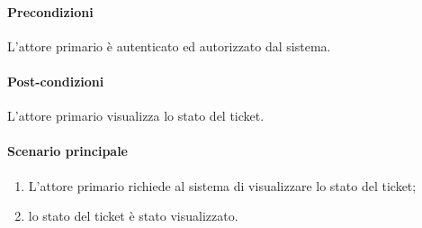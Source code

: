 \paragraph{Precondizioni}  L'attore primario è autenticato ed autorizzato dal sistema.
\paragraph{Post-condizioni} L'attore primario visualizza lo stato del ticket.
\paragraph{Scenario principale}
\begin{enumerate}
    \item L'attore primario richiede al sistema di visualizzare lo stato del ticket;
    \item lo stato del ticket è stato visualizzato.
\end{enumerate}